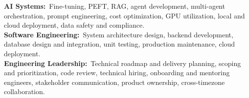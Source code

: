 
\begin{cvparagraph}
{\bodyfont\bfseries AI Systems:}~Fine-tuning, PEFT, RAG, agent development, multi-agent orchestration, prompt engineering, cost optimization, GPU utilization, local and cloud deployment, data safety and compliance.
\\[2mm]
{\bodyfont\bfseries Software Engineering:}~System architecture design, backend development, database design and integration, unit testing, production maintenance, cloud deployment.
\\[2mm]
{\bodyfont\bfseries Engineering Leadership:}~Technical roadmap and delivery planning, scoping and prioritization, code review, technical hiring, onboarding and mentoring engineers, stakeholder communication, product ownership, cross-timezone collaboration.
\end{cvparagraph}
